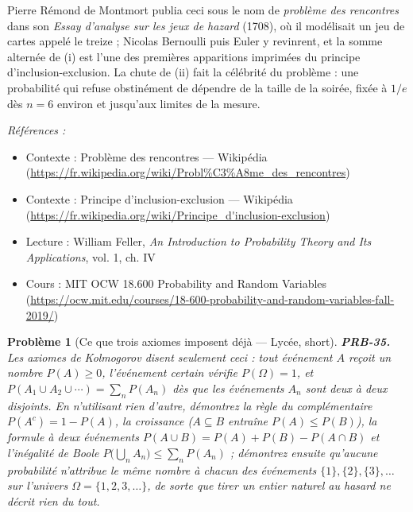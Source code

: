 \documentclass[11pt]{article}
\newtheorem{problem}{Problème}
\newenvironment{refs}{\par\small\noindent\emph{Références :}\begin{itemize}\setlength\itemsep{0pt}}{\end{itemize}\normalsize}
\begin{document}
\noindent Pierre Rémond de Montmort publia ceci sous le nom de \textit{problème des
rencontres} dans son \textit{Essay d'analyse sur les jeux de hazard} (1708), où il modélisait un
jeu de cartes appelé le treize ; Nicolas Bernoulli puis Euler y revinrent, et la somme alternée
de (i) est l'une des premières apparitions imprimées du principe d'inclusion-exclusion. La chute
de (ii) fait la célébrité du problème : une probabilité qui refuse obstinément de dépendre de la
taille de la soirée, fixée à $ 1/e $ dès $ n = 6 $ environ et jusqu'aux limites de la
mesure.

\begin{refs}
\item Contexte : Problème des rencontres --- Wikipédia (\url{https://fr.wikipedia.org/wiki/Probl%C3%A8me_des_rencontres})
\item Contexte : Principe d'inclusion-exclusion --- Wikipédia (\url{https://fr.wikipedia.org/wiki/Principe_d'inclusion-exclusion})
\item Lecture : William Feller, \textit{An Introduction to Probability Theory and Its Applications}, vol. 1, ch. IV
\item Cours : MIT OCW 18.600 Probability and Random Variables (\url{https://ocw.mit.edu/courses/18-600-probability-and-random-variables-fall-2019/})
\end{refs}

\bigskip

\begin{problem}[{Ce que trois axiomes imposent déjà --- Lycée, short}]
\textbf{PRB-35.} Les axiomes de Kolmogorov disent seulement ceci : tout
événement $ A $ reçoit un nombre $ P(A) \ge 0 $, l'événement certain vérifie
$ P(\Omega) = 1 $, et $ P(A_1 \cup A_2 \cup \cdots) = \sum_{n} P(A_n) $ dès que les événements
$ A_n $ sont deux à deux disjoints. En n'utilisant rien d'autre, démontrez la règle du
complémentaire $ P(A^c) = 1 - P(A) $, la croissance ($ A \subseteq B $ entraîne
$ P(A) \le P(B) $), la formule à deux événements
$ P(A \cup B) = P(A) + P(B) - P(A \cap B) $ et l'inégalité de Boole
$ P\big( \bigcup_n A_n \big) \le \sum_n P(A_n) $ ; démontrez ensuite qu'aucune probabilité
n'attribue le \textit{même} nombre à chacun des événements $ \{1\}, \{2\}, \{3\}, \dots $ sur
l'univers $ \Omega = \{1,2,3,\dots\} $, de sorte que \og{} tirer un entier naturel au hasard \fg{} ne
décrit rien du tout.
\end{problem}
\end{document}
